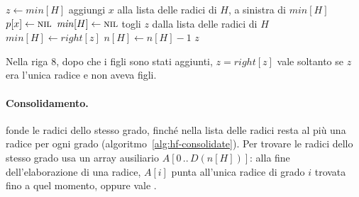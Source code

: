 \begin{algorithm}[htbp]
\caption{L'estrazione del nodo con la chiave minima: i figli di $z$ diventano radici, e poi \Consolidate{} fonde le radici dello stesso grado.}\label{alg:hf-extract}
\begin{algorithmic}[1]
  \State $z \gets \mathit{min}[H]$
      \State aggiungi $x$ alla lista delle radici di $H$, a sinistra di $\mathit{min}[H]$
      \State $p[x] \gets \textsc{nil}$
    \EndFor
      \State $\mathit{min}[H] \gets \textsc{nil}$
    \Else
      \State togli $z$ dalla lista delle radici di $H$
      \State $\mathit{min}[H] \gets \mathit{right}[z]$
      \State {}
    \EndIf
    \State $n[H] \gets n[H] - 1$
  \EndIf
  \State \Return $z$
\EndProcedure
\end{algorithmic}
\end{algorithm}

Nella riga 8, dopo che i figli sono stati aggiunti, $z = \mathit{right}[z]$ vale soltanto se $z$ era l'unica radice e non aveva figli.

\paragraph{Consolidamento.}
\Consolidate{} fonde le radici dello stesso grado, finché nella lista delle radici resta al più una radice per ogni grado (algoritmo~\ref{alg:hf-consolidate}). Per trovare le radici dello stesso grado usa un array ausiliario $A[0\,..\,D(n[H])]$: alla fine dell'elaborazione di una radice, $A[i]$ punta all'unica radice di grado $i$ trovata fino a quel momento, oppure vale \Nil{}.

